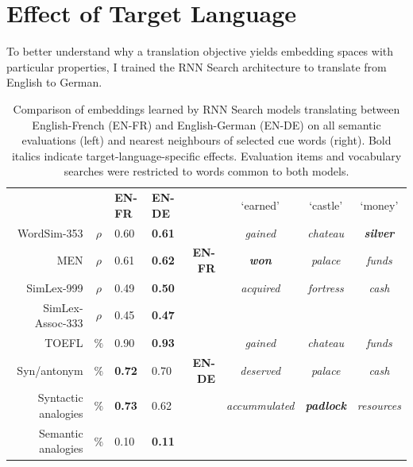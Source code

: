 \section{Effect of Target Language}
\label{lang_effects}

To better understand why a translation objective yields embedding spaces with particular properties, I trained the RNN Search architecture to translate from English to German. 

\begin{table}[ht]
\begin{center}
\begin{tabular}{r c | m{0.9cm}  m{0.9cm}  r c c c }
    \multicolumn{2}{c|}{~} &\bf  \small EN-FR &\bf  \small EN-DE &  &  `earned' & `castle' & `money'\\ 
\cline{1-4} \cline{6-8}
WordSim-353   & \(\rho\) & 0.60 & \bf 0.61 &   & {\small \emph{gained}} & {\small \emph{chateau}} & {\small \bf \emph{ silver}} \\
MEN & \(\rho\) & 0.61 & \bf 0.62 \bf & \bf \small  EN-FR  & {\small \bf \emph{won}} & {\small \emph{palace}} & {\small \emph{funds}} \\
SimLex-999 & \(\rho\) & 0.49 &  \bf 0.50 &  & {\small \emph{acquired}}  & {\small \emph{fortress}}  & {\small \emph{cash}} \\
\cline{6-8}
SimLex-Assoc-333 & \(\rho\) & 0.45  & \bf 0.47   &   &  &   \\
TOEFL & \(\%\) & 0.90 & \bf 0.93  & &  {\small \emph{gained}}&  {\small \emph{chateau}} &  {\small \emph{funds}} \\ 
Syn/antonym & \(\%\) & \bf 0.72 &  0.70  &  \bf \small EN-DE   &  {\small \emph{deserved}}    &  {\small \emph{palace}}    &  {\small \emph{cash}} \\ 
Syntactic analogies & \(\%\) & \bf 0.73 & 0.62   &  &  {\small \emph{accummulated}}   &  {\small \bf \emph{ padlock}}   &  {\small \emph{resources}} \\  
Semantic analogies & \(\%\) & 0.10 & \bf  0.11  \\
\end{tabular}
\caption{Comparison of embeddings learned by RNN Search models translating between English-French (EN-FR) and English-German (EN-DE) on all semantic evaluations (left) and nearest neighbours of selected cue words (right). Bold italics indicate target-language-specific effects. Evaluation items and vocabulary searches were restricted to words common to both models. }
\label{table:de}
\end{center}
\vspace{-5mm}
\end{table}

